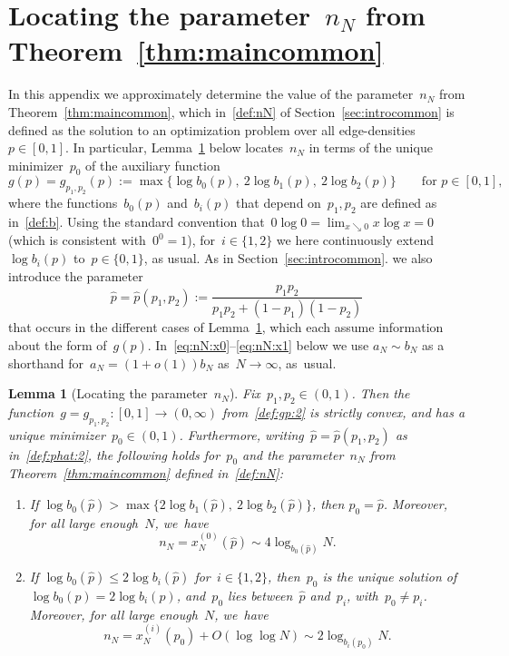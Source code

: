 \documentclass{article}
\newcommand{\xonetwo}{x^{(i)}}
\newcommand{\xot}{x^{(0)}}
\newcommand{\ps}{\hat{p}}
\newtheorem{lemma}[thm]{Lemma}
\newcommand\bigcpar[1]{\bigl\{#1\bigr\}}
\newenvironment{romenumerate}{\vspace{-0.25em}\begin{enumerate}\itemsep0pt \parskip0pt \parsep0pt\renewcommand{\labelenumi}{\textup{(\roman{enumi})}}\renewcommand{\theenumi}{\textup{(\roman{enumi})}}}{\vspace{-0.05em}\end{enumerate}\vspace{-0.05em}}
\begin{document}
\section{Locating the parameter~$n_N$ from Theorem~\ref{thm:maincommon}}
\label{sec:calcstuff}
In this appendix we approximately determine the value of the parameter~$n_N$ from Theorem~\ref{thm:maincommon}, which in~\eqref{def:nN} of Section~\ref{sec:introcommon} is defined as the solution to an optimization problem over all edge-densities~$p \in [0,1]$. 
In particular, 
Lemma~\ref{lem:figcaption} below  locates~$n_N$ in terms of the unique minimizer~$p_0$ of the auxiliary function 
\begin{equation}\label{def:gp:2}
g(p)=g_{p_1,p_2}(p):=\max\bigcpar{\log b_0(p), \: 2\log b_1(p), \: 2\log b_2(p)} \qquad \text{for~$p \in [0,1]$,}
\end{equation}
where the functions~$b_0(p)$ and~$b_i(p)$ that depend on~$p_1,p_2$ are defined as in~\eqref{def:b}. 
Using the standard convention that~$0 \log 0 = \lim_{x \searrow 0} x\log x = 0$ (which is consistent with~$0^0=1$), for~$i \in \{1,2\}$ we here continuously extend $\log b_i(p)$ to~$p \in \{0,1\}$, as usual. 
As in Section~\ref{sec:introcommon}. we also introduce the parameter
\begin{equation}\label{def:phat:2}
\ps = \ps(p_1,p_2) := \frac{p_1p_2}{p_1p_2+(1-p_1)(1-p_2)} 
\end{equation}
that occurs in the different cases of Lemma~\ref{lem:figcaption}, which each assume information about the form of~$g(\ps)$. 
In~\eqref{eq:nN:x0}--\eqref{eq:nN:x1} below we use $a_N \sim b_N$ as a shorthand for~$a_N=(1+o(1))b_N$ as~$N \to \infty$, as~usual.
\begin{lemma}[Locating the parameter~$n_N$]\label{lem:figcaption}
Fix~$p_1,p_2 \in (0,1)$. 
Then the function~$g=g_{p_1,p_2}:[0,1] \to (0,\infty)$ from~\eqref{def:gp:2} 
 is strictly convex, and 
has a unique minimizer~$p_0 \in (0,1)$.
Furthermore, writing~$\ps=\ps(p_1,p_2)$ as in~\eqref{def:phat:2}, the following holds for~$p_0$ and the parameter~$n_N$ from Theorem~\ref{thm:maincommon} defined in~\eqref{def:nN}: 
\begin{romenumerate}
    \item\label{enum:a}  If $\log b_0(\hat{p}) > \max\bigcpar{2\log b_1(\hat{p}), \: 2\log b_2(\hat{p})}$, then $p_0 = \ps$. 
    Moreover, for all large enough~$N$, we~have
\begin{equation}\label{eq:nN:x0}
n_N=\xot_N(\ps) \sim 4 \log_{b_0(\ps)} N .
\end{equation}
    \item\label{enum:b} If $\log b_0(\ps)\le 2\log b_i(\ps)$ for~$i \in \{1,2\}$, then~$p_0$ is the unique solution of~$\log b_0(p)=2\log b_i(p)$, and~$p_0$ lies between~$\ps$ and~$p_i$, with~$p_0 \neq p_i$.  
    Moreover, for all large enough~$N$, we~have
\begin{equation}\label{eq:nN:x1}
n_N=\xonetwo_N(p_0) +O(\log \log N) 
\sim 2 \log_{b_i(p_0)} N .
\end{equation}\vspace{-0.25em}\end{romenumerate}\vspace{-0.25em}\end{lemma}\vspace{-0.25em}
\end{document}

